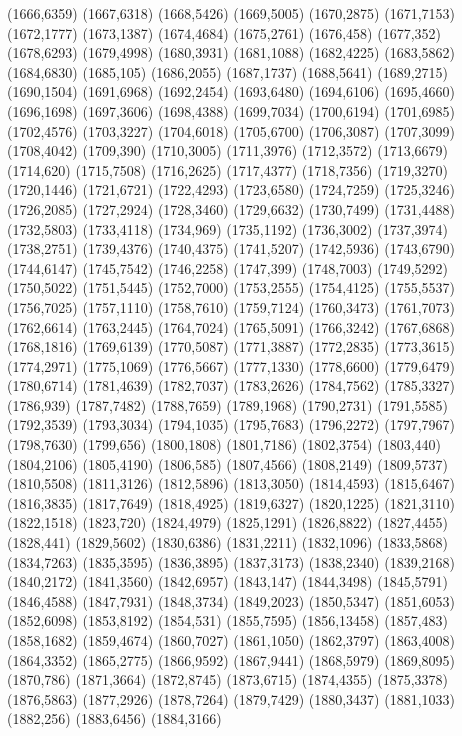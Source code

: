 (1666,6359)
(1667,6318)
(1668,5426)
(1669,5005)
(1670,2875)
(1671,7153)
(1672,1777)
(1673,1387)
(1674,4684)
(1675,2761)
(1676,458)
(1677,352)
(1678,6293)
(1679,4998)
(1680,3931)
(1681,1088)
(1682,4225)
(1683,5862)
(1684,6830)
(1685,105)
(1686,2055)
(1687,1737)
(1688,5641)
(1689,2715)
(1690,1504)
(1691,6968)
(1692,2454)
(1693,6480)
(1694,6106)
(1695,4660)
(1696,1698)
(1697,3606)
(1698,4388)
(1699,7034)
(1700,6194)
(1701,6985)
(1702,4576)
(1703,3227)
(1704,6018)
(1705,6700)
(1706,3087)
(1707,3099)
(1708,4042)
(1709,390)
(1710,3005)
(1711,3976)
(1712,3572)
(1713,6679)
(1714,620)
(1715,7508)
(1716,2625)
(1717,4377)
(1718,7356)
(1719,3270)
(1720,1446)
(1721,6721)
(1722,4293)
(1723,6580)
(1724,7259)
(1725,3246)
(1726,2085)
(1727,2924)
(1728,3460)
(1729,6632)
(1730,7499)
(1731,4488)
(1732,5803)
(1733,4118)
(1734,969)
(1735,1192)
(1736,3002)
(1737,3974)
(1738,2751)
(1739,4376)
(1740,4375)
(1741,5207)
(1742,5936)
(1743,6790)
(1744,6147)
(1745,7542)
(1746,2258)
(1747,399)
(1748,7003)
(1749,5292)
(1750,5022)
(1751,5445)
(1752,7000)
(1753,2555)
(1754,4125)
(1755,5537)
(1756,7025)
(1757,1110)
(1758,7610)
(1759,7124)
(1760,3473)
(1761,7073)
(1762,6614)
(1763,2445)
(1764,7024)
(1765,5091)
(1766,3242)
(1767,6868)
(1768,1816)
(1769,6139)
(1770,5087)
(1771,3887)
(1772,2835)
(1773,3615)
(1774,2971)
(1775,1069)
(1776,5667)
(1777,1330)
(1778,6600)
(1779,6479)
(1780,6714)
(1781,4639)
(1782,7037)
(1783,2626)
(1784,7562)
(1785,3327)
(1786,939)
(1787,7482)
(1788,7659)
(1789,1968)
(1790,2731)
(1791,5585)
(1792,3539)
(1793,3034)
(1794,1035)
(1795,7683)
(1796,2272)
(1797,7967)
(1798,7630)
(1799,656)
(1800,1808)
(1801,7186)
(1802,3754)
(1803,440)
(1804,2106)
(1805,4190)
(1806,585)
(1807,4566)
(1808,2149)
(1809,5737)
(1810,5508)
(1811,3126)
(1812,5896)
(1813,3050)
(1814,4593)
(1815,6467)
(1816,3835)
(1817,7649)
(1818,4925)
(1819,6327)
(1820,1225)
(1821,3110)
(1822,1518)
(1823,720)
(1824,4979)
(1825,1291)
(1826,8822)
(1827,4455)
(1828,441)
(1829,5602)
(1830,6386)
(1831,2211)
(1832,1096)
(1833,5868)
(1834,7263)
(1835,3595)
(1836,3895)
(1837,3173)
(1838,2340)
(1839,2168)
(1840,2172)
(1841,3560)
(1842,6957)
(1843,147)
(1844,3498)
(1845,5791)
(1846,4588)
(1847,7931)
(1848,3734)
(1849,2023)
(1850,5347)
(1851,6053)
(1852,6098)
(1853,8192)
(1854,531)
(1855,7595)
(1856,13458)
(1857,483)
(1858,1682)
(1859,4674)
(1860,7027)
(1861,1050)
(1862,3797)
(1863,4008)
(1864,3352)
(1865,2775)
(1866,9592)
(1867,9441)
(1868,5979)
(1869,8095)
(1870,786)
(1871,3664)
(1872,8745)
(1873,6715)
(1874,4355)
(1875,3378)
(1876,5863)
(1877,2926)
(1878,7264)
(1879,7429)
(1880,3437)
(1881,1033)
(1882,256)
(1883,6456)
(1884,3166)
